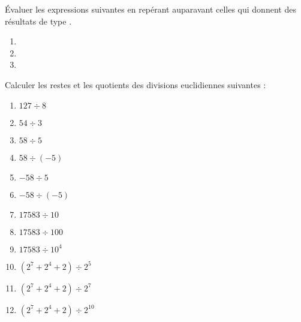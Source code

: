 \'Evaluer les expressions suivantes en repérant auparavant celles qui donnent des résultats de type .%

\begin{multicols}{4}
  \begin{enumerate}[label=\emph{\alph*)}]
    \item {}
    \item {}
    \item {}
  \end{enumerate}
\end{multicols}%

Calculer les restes et les quotients des divisions euclidiennes suivantes : 
\begin{multicols}{4}
  \begin{enumerate}[label=\emph{\alph*)}]
    \item $127 \div 8$
    \item $54 \div 3$
    \item $58 \div 5$
    \item $58 \div (-5)$
    \item $-58 \div 5$
    \item $-58 \div (-5)$
    \item $17583 \div 10$
    \item $17583 \div 100$
    \item $17583 \div 10^4$
    \item $(2^7+2^4+2) \div 2^5$
    \item $(2^7+2^4+2) \div 2^7$
    \item $(2^7+2^4+2) \div 2^{10}$
  \end{enumerate}
\end{multicols}

